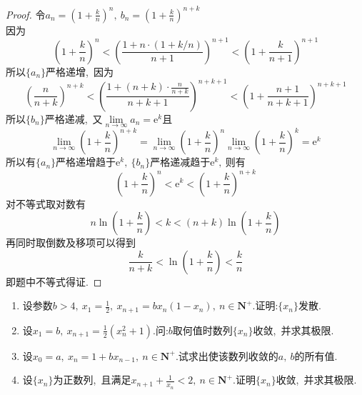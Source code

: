 \begin{proof}
	令$a_n=\left(1+\frac{k}{n}\right)^n,\ b_n=\left(1+\frac{k}{n}\right)^{n+k}$\\
	因为
	$$\left(1+\frac{k}{n}\right)^n<\left(\frac{1+n\cdot(1+k/n)}{n+1}\right)^{n+1}<\left(1+\frac{k}{n+1}\right)^{n+1}$$
	所以$\{a_n\}$严格递增,\ 因为
	$$\left(\frac{n}{n+k}\right)^{n+k}<\left(\frac{1+(n+k)\cdot\frac{n}{n+k}}{n+k+1}\right)^{n+k+1}<\left(1+\frac{n+1}{n+k+1}\right)^{n+k+1}$$
	所以$\{b_n\}$严格递减,\ 又$\lim\limits_{n\rightarrow\infty}a_n=\mathrm{e}^k$且
	$$\lim\limits_{n\rightarrow\infty}\left(1+\frac{k}{n}\right)^{n+k}=\lim\limits_{n\rightarrow\infty}\left(1+\frac{k}{n}\right)^{n}\lim\limits_{n\rightarrow\infty}\left(1+\frac{k}{n}\right)^{k}=\mathrm{e}^k$$
	所以有$\{a_n\}$严格递增趋于$\mathrm{e}^k,\ \{b_n\}$严格递减趋于$\mathrm{e}^k,\ $则有
	$$\left(1+\frac{k}{n}\right)^{n}<\mathrm{e}^k<\left(1+\frac{k}{n}\right)^{n+k}$$
	对不等式取对数有
	$$n\ln\left(1+\frac{k}{n}\right)<k<(n+k)\ln\left(1+\frac{k}{n}\right)$$
	再同时取倒数及移项可以得到
	$$\frac{k}{n+k}<\ln\left(1+\frac{k}{n}\right)<\frac{k}{n}$$
	即题中不等式得证.
\end{proof}
\newpage
\begin{problem}
	\begin{enumerate}
		\item 设参数$b>4,\ x_1=\frac{1}{2},\ x_{n+1}=bx_n(1-x_n),\ n\in\mathbf{N}^+.$证明:$\{x_n\}$发散.
		\item 设$x_1=b,\ x_{n+1}=\frac{1}{2}(x_n^2+1).$问:$b$取何值时数列$\{x_n\}$收敛,\ 并求其极限.
		\item 设$x_0=a,\ x_n=1+bx_{n-1},\ n\in\mathbf{N}^+.$试求出使该数列收敛的$a,\ b$的所有值.
		\item 设$\{x_n\}$为正数列,\ 且满足$x_{n+1}+\frac{1}{x_n}<2,\ n\in\mathbf{N}^+.$证明$\{x_n\}$收敛,\ 并求其极限.
	\end{enumerate}
\end{problem}

